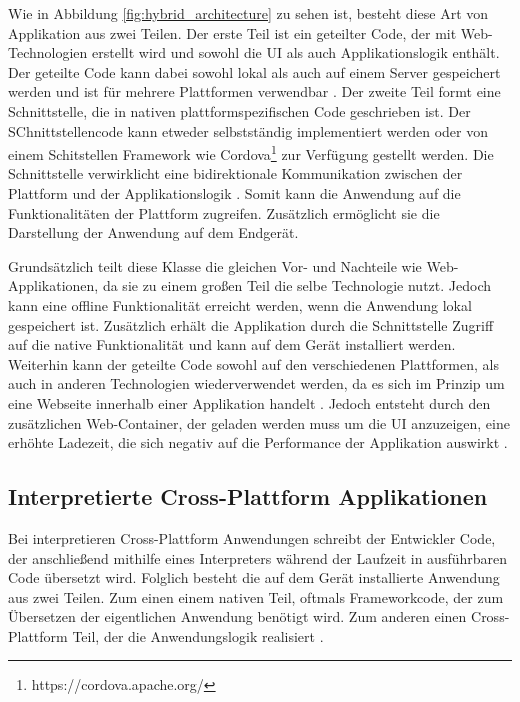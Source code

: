 Wie in Abbildung \ref{fig:hybrid_architecture} zu sehen ist, besteht diese Art von Applikation aus zwei Teilen.
Der erste Teil ist ein geteilter Code, der mit Web-Technologien erstellt wird und sowohl die UI als auch Applikationslogik enthält. Der geteilte Code kann dabei sowohl lokal als auch auf einem Server gespeichert werden und ist für mehrere Plattformen verwendbar \cite{2017hybrid_approach_end}.
Der zweite Teil formt eine Schnittstelle, die in nativen plattformspezifischen Code geschrieben ist. Der SChnittstellencode kann etweder selbstständig implementiert werden oder von einem Schitstellen Framework wie Cordova\footnote{https://cordova.apache.org/} zur Verfügung gestellt werden. Die Schnittstelle verwirklicht eine bidirektionale Kommunikation zwischen der Plattform und der Applikationslogik \cite{ELKASSAS2017163}. Somit kann die Anwendung auf die Funktionalitäten der Plattform zugreifen. Zusätzlich ermöglicht sie die Darstellung der Anwendung auf dem Endgerät. 

Grundsätzlich teilt diese Klasse die gleichen Vor- und Nachteile wie Web-Applikationen, da sie zu einem großen Teil die selbe Technologie nutzt. Jedoch kann eine offline Funktionalität erreicht werden, wenn die Anwendung lokal gespeichert ist. Zusätzlich erhält die Applikation durch die Schnittstelle Zugriff auf die native Funktionalität und kann auf dem Gerät installiert werden. Weiterhin kann der geteilte Code sowohl auf den verschiedenen Plattformen, als auch in anderen Technologien wiederverwendet werden, da es sich im Prinzip um eine Webseite innerhalb einer Applikation handelt \cite{IEEE_development_classes}. Jedoch entsteht durch den zusätzlichen Web-Container, der geladen werden muss um die UI anzuzeigen, eine erhöhte Ladezeit, die sich negativ auf die Performance der Applikation auswirkt \cite{IEEE_development_classes}.

\subsection{Interpretierte Cross-Plattform Applikationen}
Bei interpretieren Cross-Plattform Anwendungen schreibt der Entwickler Code, der anschließend mithilfe eines Interpreters während der Laufzeit in ausführbaren Code übersetzt wird. Folglich besteht die auf dem Gerät installierte Anwendung aus zwei Teilen. Zum einen einem nativen Teil, oftmals Frameworkcode, der zum Übersetzen der eigentlichen Anwendung benötigt wird. Zum anderen einen Cross-Plattform Teil, der die Anwendungslogik realisiert \cite{IEEE_development_classes}.

